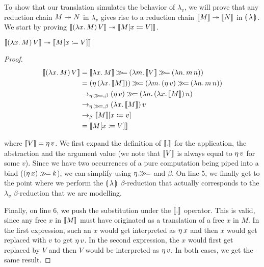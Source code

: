To show that our translation simulates the behavior of $\lambda_v$, we will
prove that any reduction chain $M \twoheadrightarrow N$ in $\lambda_v$ gives rise to a
reduction chain $\llbracket M \rrbracket \twoheadrightarrow \llbracket N \rrbracket$ in $\llparenthesis \, \lambda \, \rrparenthesis$. We start by
proving $\llbracket (\lambda x.\, M)\,V \rrbracket \twoheadrightarrow \llbracket M[x \coloneqq V] \rrbracket$.

\begin{property}
  $\llbracket (\lambda x.\, M)\,V \rrbracket \twoheadrightarrow \llbracket M[x \coloneqq V] \rrbracket$
\end{property}

\begin{proof}

\begin{align}
  \llbracket (\lambda x.\, M)\,V \rrbracket
&= \llbracket \lambda x.\, M \rrbracket \mathbin{\gg\!=} (\lambda m.\, \llbracket V \rrbracket \mathbin{\gg\!=} (\lambda n.\, m\,n)) \\
&= (\eta\,(\lambda x.\, \llbracket M \rrbracket)) \mathbin{\gg\!=} (\lambda m.\, (\eta\,v) \mathbin{\gg\!=} (\lambda n.\, m\,n)) \\
&\to_{\eta.\mathbin{\gg\!=},\beta} (\eta\,v) \mathbin{\gg\!=} (\lambda n.\, (\lambda x.\, \llbracket M \rrbracket)\,n) \\
&\to_{\eta.\mathbin{\gg\!=},\beta} (\lambda x.\, \llbracket M \rrbracket)\,v \\
&\to_{\beta} \llbracket M \rrbracket[x \coloneqq v] \\
&= \llbracket M[x \coloneqq V] \rrbracket
\end{align}
\setcounter{equation}{0}

where $\llbracket V \rrbracket = \eta\,v$. We first expand the definition of $\llbracket . \rrbracket$
for the application, the abstraction and the argument value (we note that
$\llbracket V \rrbracket$ is always equal to $\eta\,v$ for some $v$). Since we have
two occurrences of a pure computation being piped into a bind
($(\eta\,x) \mathbin{\gg\!=} k$), we can simplify using $\eta.\mathbin{\gg\!=}$ and
$\beta$. On line 5, we finally get to the point where we perform the
$\llparenthesis \, \lambda \, \rrparenthesis$ $\beta$-reduction that actually corresponds to the
$\lambda_v$ $\beta$-reduction that we are modelling.

Finally, on line 6, we push the substitution under the $\llbracket . \rrbracket$
operator. This is valid, since any free $x$ in $\llbracket M \rrbracket$ must have
originated as a translation of a free $x$ in $M$. In the first expression,
such an $x$ would get interpreted as $\eta\,x$ and then $x$ would get
replaced with $v$ to get $\eta\,v$. In the second expression, the $x$
would first get replaced by $V$ and then $V$ would be interpreted as
$\eta\,v$. In both cases, we get the same result.

\end{proof}

